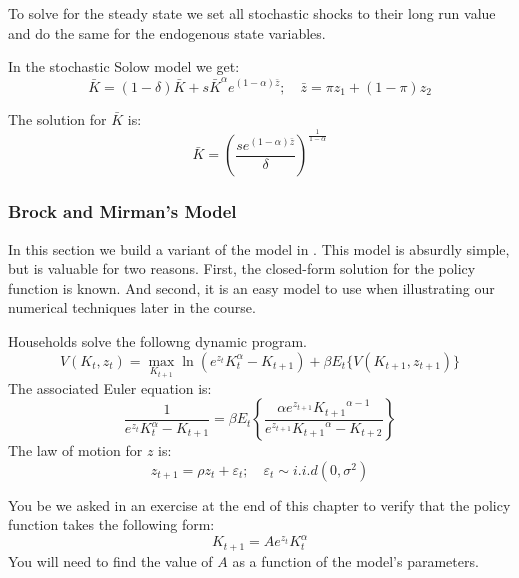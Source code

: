 \documentclass[letterpaper,12pt]{article}
\newcommand{\ve}{\varepsilon}
\theoremstyle{definition}
\begin{document}
\begin{spacing}{1.5}
			To solve for the steady state we set all stochastic shocks to their long run value and do the same for the endogenous state variables.

			In the stochastic Solow model we get:
			\begin{equation}
			 \bar K = (1-\delta)\bar K  + s \bar K^\alpha e^{(1-\alpha)\bar z}  ; \quad \bar z = \pi z_1 + (1-\pi)z_2
			\end{equation}

			The solution for $\bar K$ is:
			\begin{equation}
			\bar K = \left(\frac{se^{(1-\alpha)\bar z}}{\delta}\right)^{\frac{1}{1-\alpha}}
			\end{equation}


		\subsubsection{Brock and Mirman's Model} \label{DSGE_BrockMirman}
			In this section we build a variant of the model in \citet{BrockMirman1972}.  This model is absurdly simple, but is valuable for two reasons.  First, the closed-form solution for the policy function is known.   And second, it is an easy model to use when illustrating our numerical techniques later in the course.

			Households solve the followng dynamic program.
			\begin{equation}\label{DSGE_BMBellman}
			V(K_t,z_t) = \max_{K_{t+1}}\ln (e^{z_t}K_t^\alpha - K_{t+1}) + \beta E_t\{V(K_{t+1},z_{t+1})\}
			\end{equation}
			The associated Euler equation is:
			\begin{equation}\label{DSGE_BMEuler}
			\frac{1}{e^{z_t}K_t^\alpha - K_{t+1}} = \beta E_t \left\{\frac{\alpha e^{z_{t+1}}{K_{t+1}}^{\alpha-1}}{e^{z_{t+1}}{K_{t+1}}^\alpha - K_{t+2}} \right\}
			\end{equation}
			The law of motion for $z$ is:
			\begin{equation}\label{LOM}
			z_{t+1} = \rho z_t + \ve_t; \quad \ve_t \sim i.i.d(0,\sigma^2)
			\end{equation}
			
			You be we asked in an exercise at the end of this chapter to verify that the policy function takes the following form:
			\begin{equation}\label{DSGE_BMpolicy}
			K_{t+1} = A e^{z_t}K_t^\alpha
			\end{equation}
			You will need to find the value of $A$ as a function of the model's parameters.


\end{spacing}
\end{document}
